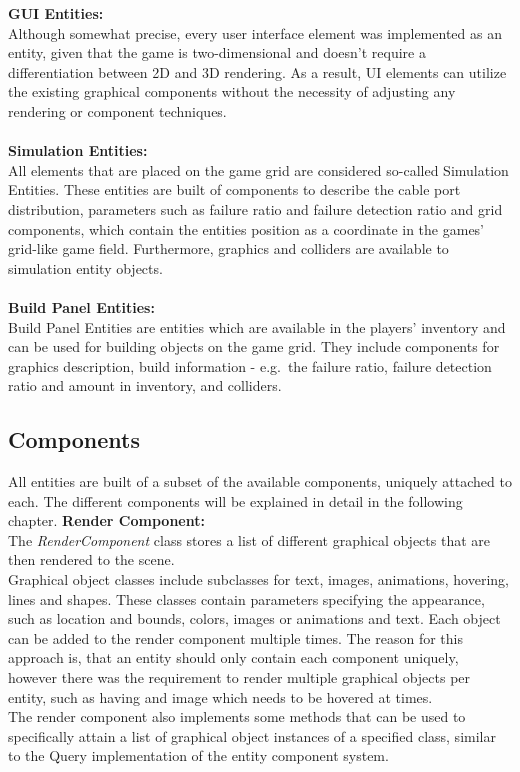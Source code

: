 \textbf{GUI Entities:} \\
Although somewhat precise, every user interface element was implemented as an entity, given that the game is two-dimensional and doesn't require a differentiation between 2D and 3D rendering.
As a result, UI elements can utilize the existing graphical components without the necessity of adjusting any rendering or component techniques.
\\ \\
\textbf{Simulation Entities:} \\
All elements that are placed on the game grid are considered so-called Simulation Entities.
These entities are built of components to describe the cable port distribution, parameters such as failure ratio and failure detection ratio and grid components, which contain the
entities position as a coordinate in the games' grid-like game field.
Furthermore, graphics and colliders are available to simulation entity objects.
\\ \\
\textbf{Build Panel Entities:} \\
Build Panel Entities are entities which are available in the players' inventory and can be used for building objects on the game grid.
They include components for graphics description, build information - e.g.\ the failure ratio, failure detection ratio and amount in inventory,
and colliders.

\subsection{Components}\label{subsec:components}
All entities are built of a subset of the available components, uniquely attached to each.
The different components will be explained in detail in the following chapter.
\textbf{Render Component:} \\
The \textit{RenderComponent} class stores a list of different graphical objects that are then rendered to the scene.\\
Graphical object classes include subclasses for text, images, animations, hovering, lines and shapes.
These classes contain parameters specifying the appearance, such as location and bounds, colors, images or animations and text.
Each object can be added to the render component multiple times.
The reason for this approach is, that an entity should only contain each component uniquely, however there was the requirement to render multiple graphical
objects per entity, such as having and image which needs to be hovered at times. \\
The render component also implements some methods that can be used to specifically attain a list of graphical object instances of a specified class, similar to the Query
implementation of the entity component system.\\ \\

